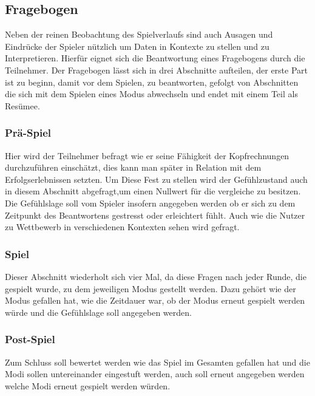 \subsection{Fragebogen}
Neben der reinen Beobachtung des Spielverlaufs sind auch Ausagen und Eindrücke der Spieler nützlich um Daten in Kontexte zu stellen und zu Interpretieren. Hierfür eignet sich die Beantwortung eines Fragebogens durch die Teilnehmer. Der Fragebogen lässt sich in drei Abschnitte aufteilen, der erste Part ist zu beginn, damit vor dem Spielen, zu beantworten, gefolgt von Abschnitten die sich mit dem Spielen eines Modus abwechseln und endet mit einem Teil als Resümee.
\subsubsection{Prä-Spiel}
Hier wird der Teilnehmer befragt wie er seine Fähigkeit der Kopfrechnungen durchzuführen einschätzt, dies kann man später in Relation mit dem Erfolgserlebnissen setzten. Um Diese Fest zu stellen wird der Gefühlzustand auch in diesem Abschnitt abgefragt,um einen Nullwert für die vergleiche zu besitzen. Die Gefühlslage soll vom Spieler insofern angegeben werden ob er sich zu dem Zeitpunkt des Beantwortens gestresst oder erleichtert fühlt. Auch wie die Nutzer zu Wettbewerb in verschiedenen Kontexten sehen wird gefragt.
\subsubsection{Spiel}
Dieser Abschnitt wiederholt sich vier Mal, da diese Fragen nach jeder Runde, die gespielt wurde, zu dem jeweiligen Modus gestellt werden. Dazu gehört  wie der Modus gefallen hat, wie die Zeitdauer war, ob der Modus erneut gespielt werden würde und die Gefühlslage soll angegeben werden.
\subsubsection{Post-Spiel}
Zum Schluss soll bewertet werden wie das Spiel im Gesamten gefallen hat und die Modi sollen untereinander eingestuft werden, auch soll erneut angegeben werden welche Modi erneut gespielt werden würden.

